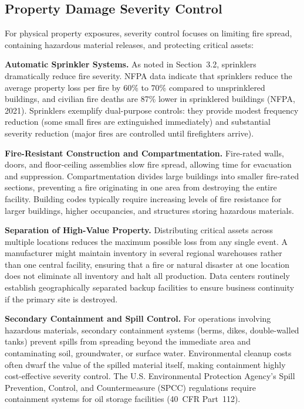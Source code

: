\documentclass[11pt,openany]{book}
\begin{document}
\subsection{Property Damage Severity Control}

For physical property exposures, severity control focuses on limiting fire
spread, containing hazardous material releases, and protecting critical
assets:

\textbf{Automatic Sprinkler Systems.} As noted in Section~3.2, sprinklers
dramatically reduce fire severity. NFPA data indicate that sprinklers reduce
the average property loss per fire by 60\% to 70\% compared to unsprinklered
buildings, and civilian fire deaths are 87\% lower in sprinklered buildings
(NFPA, 2021). Sprinklers exemplify dual-purpose controls: they provide modest
frequency reduction (some small fires are extinguished immediately) and
substantial severity reduction (major fires are controlled until firefighters
arrive).

\textbf{Fire-Resistant Construction and Compartmentation.} Fire-rated walls,
doors, and floor-ceiling assemblies slow fire spread, allowing time for
evacuation and suppression. Compartmentation divides large buildings into
smaller fire-rated sections, preventing a fire originating in one area from
destroying the entire facility. Building codes typically require increasing
levels of fire resistance for larger buildings, higher occupancies, and
structures storing hazardous materials.

\textbf{Separation of High-Value Property.} Distributing critical assets
across multiple locations reduces the maximum possible loss from any single
event. A manufacturer might maintain inventory in several regional warehouses
rather than one central facility, ensuring that a fire or natural disaster at
one location does not eliminate all inventory and halt all production. Data
centers routinely establish geographically separated backup facilities to
ensure business continuity if the primary site is destroyed.

\textbf{Secondary Containment and Spill Control.} For operations involving
hazardous materials, secondary containment systems (berms, dikes, double-walled
tanks) prevent spills from spreading beyond the immediate area and
contaminating soil, groundwater, or surface water. Environmental cleanup costs
often dwarf the value of the spilled material itself, making containment
highly cost-effective severity control. The U.S. Environmental Protection
Agency's Spill Prevention, Control, and Countermeasure (SPCC) regulations
require containment systems for oil storage facilities (40~CFR Part~112).
\end{document}
